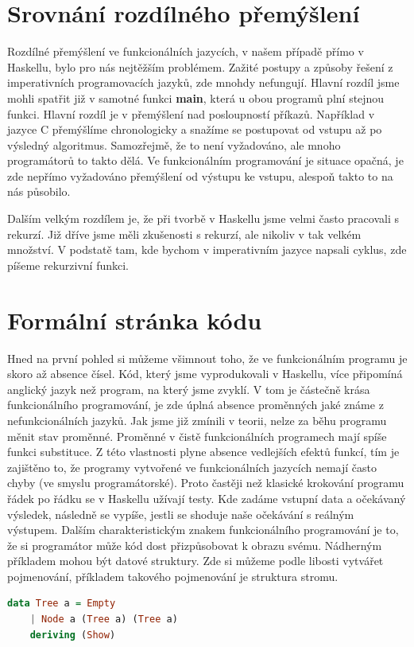 \documentclass[12pt,a4paper]{report}
\begin{document}
\section{Srovnání rozdílného přemýšlení}
Rozdílné přemýšlení ve funkcionálních jazycích, v našem případě přímo v Haskellu, bylo pro nás nejtěžším problémem. Zažité postupy a způsoby řešení z imperativních programovacích jazyků, zde mnohdy nefungují. Hlavní rozdíl jsme mohli spatřit již v samotné funkci \textbf{main}, která u obou programů plní stejnou funkci. Hlavní rozdíl je v přemýšlení nad posloupností příkazů. Například v jazyce C přemýšlíme chronologicky a snažíme se postupovat od vstupu až po výsledný algoritmus. Samozřejmě, že to není vyžadováno, ale mnoho programátorů to takto dělá. Ve funkcionálním programování je situace opačná, je zde nepřímo vyžadováno přemýšlení od výstupu ke vstupu, alespoň takto to na nás působilo.  

Dalším velkým rozdílem je, že při tvorbě v Haskellu jsme velmi často pracovali s rekurzí. Již dříve jsme měli zkušenosti s rekurzí, ale nikoliv v tak velkém množství. V podstatě tam, kde bychom v imperativním jazyce napsali cyklus, zde píšeme rekurzivní funkci. 

\section{Formální stránka kódu}
Hned na první pohled si můžeme všimnout toho, že ve funkcionálním programu je skoro až absence čísel. Kód, který jsme vyprodukovali v Haskellu, více připomíná anglický jazyk než program, na který jsme zvyklí. V tom je částečně krása funkcionálního programování, je zde úplná absence proměnných jaké známe z nefunkcionálních jazyků. Jak jsme již zmínili v teorii, nelze za běhu programu měnit stav proměnné. Proměnné v čistě funkcionálních programech mají spíše funkci substituce. Z této vlastnosti plyne absence vedlejších efektů funkcí, tím je zajištěno to, že programy vytvořené ve funkcionálních jazycích nemají často chyby (ve smyslu programátorské). Proto častěji než klasické krokování programu řádek po řádku se v Haskellu užívají testy. Kde zadáme vstupní data a očekávaný výsledek, následně se vypíše, jestli se shoduje naše očekávání s reálným výstupem.  
\newpage
Dalším charakteristickým znakem funkcionálního programování je to, že si programátor může kód dost přizpůsobovat k obrazu svému. Nádherným příkladem mohou být datové struktury. Zde si můžeme podle libosti vytvářet pojmenování, příkladem takového pojmenování je struktura stromu.
\begin{lstlisting}[language=Haskell, caption={Definice datového typu Tree}, captionpos=b,]
data Tree a = Empty
    | Node a (Tree a) (Tree a)
    deriving (Show)
\end{lstlisting}
\end{document}
